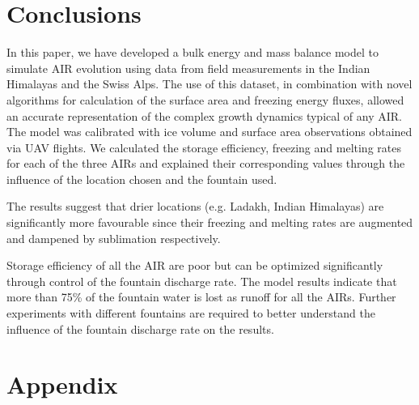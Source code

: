 \documentclass[utf8]{frontiersSCNS} %
\begin{document}



\section{Conclusions}
In this paper, we have developed a bulk energy and mass balance model to simulate AIR evolution using data from
field measurements in the Indian Himalayas and the Swiss Alps. The use of this dataset, in combination with novel
algorithms for calculation of the surface area and freezing energy fluxes, allowed an accurate representation of
the complex growth dynamics typical of any AIR. The model was calibrated with ice volume and surface area
observations obtained via UAV flights. We calculated the storage efficiency, freezing and melting rates for each of
the three AIRs and explained their corresponding values through the influence of the location chosen and the
fountain used.

The results suggest that drier locations (e.g. Ladakh, Indian Himalayas) are significantly more favourable since
their freezing and melting rates are augmented and dampened by sublimation respectively.

Storage efficiency of all the AIR are poor but can be optimized significantly through control of the fountain
discharge rate.  The model results indicate that more than 75\% of the fountain water is lost as runoff for all the
AIRs.  Further experiments with different fountains are required to better understand the influence of the fountain
discharge rate on the results.

\section{Appendix}
\end{document}
